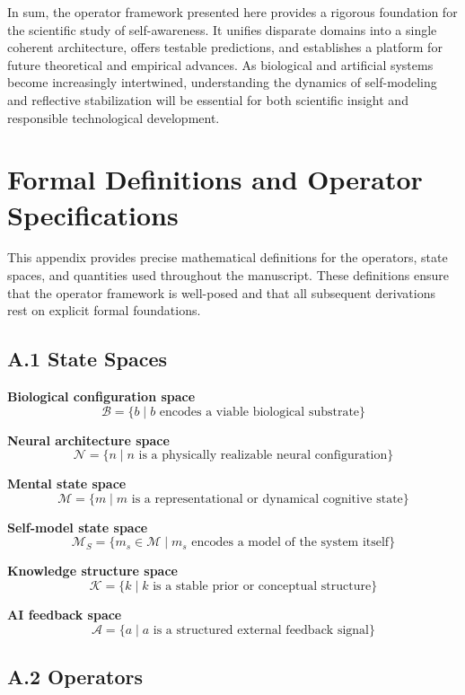 \documentclass[12pt]{article}
\begin{document}
In sum, the operator framework presented here provides a rigorous foundation for the scientific study of self-awareness. It unifies disparate domains into a single coherent architecture, offers testable predictions, and establishes a platform for future theoretical and empirical advances. As biological and artificial systems become increasingly intertwined, understanding the dynamics of self-modeling and reflective stabilization will be essential for both scientific insight and responsible technological development.

\appendix

\section{Formal Definitions and Operator Specifications}

This appendix provides precise mathematical definitions for the operators, state spaces, and quantities used throughout the manuscript. These definitions ensure that the operator framework is well-posed and that all subsequent derivations rest on explicit formal foundations.

\subsection*{A.1 State Spaces}

\textbf{Biological configuration space}
\[
\mathcal{B} = \{b \mid b \text{ encodes a viable biological substrate}\}
\]

\textbf{Neural architecture space}
\[
\mathcal{N} = \{n \mid n \text{ is a physically realizable neural configuration}\}
\]

\textbf{Mental state space}
\[
\mathcal{M} = \{m \mid m \text{ is a representational or dynamical cognitive state}\}
\]

\textbf{Self-model state space}
\[
\mathcal{M}_S = \{m_s \in \mathcal{M} \mid m_s \text{ encodes a model of the system itself}\}
\]

\textbf{Knowledge structure space}
\[
\mathcal{K} = \{k \mid k \text{ is a stable prior or conceptual structure}\}
\]

\textbf{AI feedback space}
\[
\mathcal{A} = \{a \mid a \text{ is a structured external feedback signal}\}
\]

\subsection*{A.2 Operators}
\end{document}
